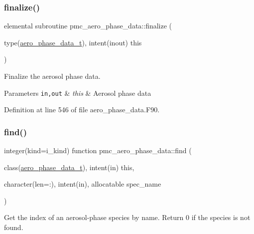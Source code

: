 \subsubsection{\texorpdfstring{finalize()}{finalize()}}
{\footnotesize\ttfamily elemental subroutine pmc\+\_\+aero\+\_\+phase\+\_\+data\+::finalize (\begin{DoxyParamCaption}\item[{type(\mbox{\hyperlink{structpmc__aero__phase__data_1_1aero__phase__data__t}{aero\+\_\+phase\+\_\+data\+\_\+t}}), intent(inout)}]{this }\end{DoxyParamCaption})\hspace{0.3cm}{\ttfamily [private]}}



Finalize the aerosol phase data. 


\begin{DoxyParams}[1]{Parameters}
\mbox{\tt in,out}  & {\em this} & Aerosol phase data \\
\hline
\end{DoxyParams}


Definition at line 546 of file aero\+\_\+phase\+\_\+data.\+F90.

\mbox{\label{namespacepmc__aero__phase__data_ae63c2f36492266db6cf4e737997689b9}} 
\subsubsection{\texorpdfstring{find()}{find()}}
{\footnotesize\ttfamily integer(kind=i\+\_\+kind) function pmc\+\_\+aero\+\_\+phase\+\_\+data\+::find (\begin{DoxyParamCaption}\item[{class(\mbox{\hyperlink{structpmc__aero__phase__data_1_1aero__phase__data__t}{aero\+\_\+phase\+\_\+data\+\_\+t}}), intent(in)}]{this,  }\item[{character(len=\+:), intent(in), allocatable}]{spec\+\_\+name }\end{DoxyParamCaption})\hspace{0.3cm}{\ttfamily [private]}}



Get the index of an aerosol-\/phase species by name. Return 0 if the species is not found. 


